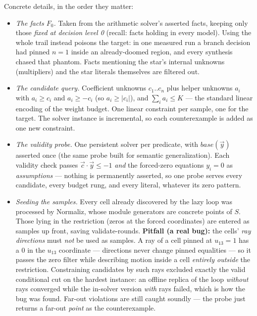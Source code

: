 \documentclass[11pt]{article}
\newcommand{\normaliz}{\textsf{Normaliz}\xspace}
\newcommand{\Sset}{\ensuremath{S}}
\newcommand{\vy}{\ensuremath{\vec{y}}\xspace}
\newcommand{\vc}{\ensuremath{\vec{c}}\xspace}
\begin{document}
Concrete details, in the order they matter:

\begin{itemize}
\item \emph{The facts $F_0$.} Taken from the arithmetic solver's asserted
  facts, keeping only those \emph{fixed at decision level 0} (recall:
  facts holding in every model). Using the whole trail instead poisons
  the target: in one measured run a branch decision had pinned $n = 1$
  inside an already-doomed region, and every synthesis chased that
  phantom. Facts mentioning the star's internal unknowns (multipliers)
  and the star literals themselves are filtered out.
\item \emph{The candidate query.} Coefficient unknowns $c_1..c_n$ plus
  helper unknowns $a_i$ with $a_i \ge c_i$ and $a_i \ge -c_i$ (so
  $a_i \ge |c_i|$), and $\sum_i a_i \le K$ --- the standard linear
  encoding of the weight budget. One linear constraint per sample, one
  for the target. The solver instance is incremental, so each
  counterexample is added as one new constraint.
\item \emph{The validity probe.} One persistent solver per predicate,
  with $\mathit{base}(\vy)$ asserted once (the same probe built for
  semantic generalization). Each validity check passes
  $\vc \cdot \vy \le -1$ \emph{and} the forced-zero equations
  $y_i = 0$ as \emph{assumptions} --- nothing is permanently asserted, so
  one probe serves every candidate, every budget rung, and every literal,
  whatever its zero pattern.
\item \emph{Seeding the samples.} Every cell already discovered by the
  lazy loop was processed by \normaliz, whose module generators are
  concrete points of $\Sset$. Those lying in the restriction (zeros at
  the forced coordinates) are entered as samples up front, saving
  validate-rounds. \textbf{Pitfall (a real bug):} the cells' \emph{ray
  directions} must \emph{not} be used as samples. A ray of a cell pinned
  at $u_{13} = 1$ has a $0$ in the $u_{13}$ coordinate --- directions
  never change pinned equalities --- so it passes the zero filter while
  describing motion inside a cell \emph{entirely outside} the
  restriction. Constraining candidates by such rays excluded exactly the
  valid conditional cut on the hardest instance: an offline replica of
  the loop \emph{without} rays converged while the in-solver version
  \emph{with} rays failed, which is how the bug was found. Far-out
  violations are still caught soundly --- the probe just returns a
  far-out \emph{point} as the counterexample.

\end{itemize}
\end{document}
